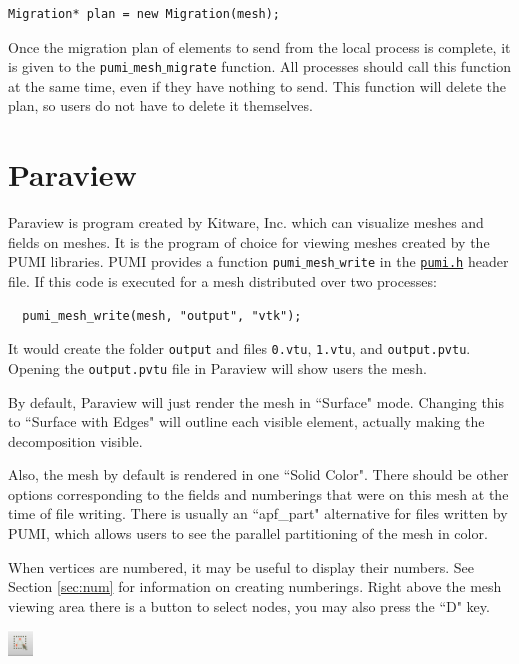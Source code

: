 \documentclass{article}
\begin{document}
{\begin{lstlisting}
Migration* plan = new Migration(mesh);
\end{lstlisting}

Once the migration plan of elements to send from
the local process is complete, it is given to the \texttt{pumi$\_$mesh$\_$migrate}
function.
All processes should call this function at the
same time, even if they have nothing to send.
This function will delete the plan, so users
do not have to delete it themselves.

\appendix

\section{Paraview}
\label{sec:paraview}

Paraview is program created by Kitware, Inc. which can visualize meshes
and fields on meshes.
It is the program of choice for viewing meshes created by the PUMI libraries.
PUMI provides a function \texttt{pumi$\_$mesh$\_$write} 
in the \href{https://github.com/SCOREC/core/blob/master/pumi/pumi.h}{\texttt{pumi.h}}
header file.
If this code is executed for a mesh distributed over two processes:

\begin{lstlisting}
  pumi_mesh_write(mesh, "output", "vtk");
\end{lstlisting}

It would create the folder \texttt{output} and files \texttt{0.vtu}, \texttt{1.vtu},
and \texttt{output.pvtu}.
Opening the \texttt{output.pvtu} file in Paraview will show users the
mesh.

By default, Paraview will just render the mesh in ``Surface" mode.
Changing this to ``Surface with Edges" will outline each visible element,
actually making the decomposition visible.

Also, the mesh by default is rendered in one ``Solid Color".
There should be other options corresponding to the fields and numberings
that were on this mesh at the time of file writing.
There is usually an ``apf\_part" alternative for files written by PUMI, which
allows users to see the parallel partitioning of the mesh in color.

When vertices are numbered, it may be useful to display their numbers.
See Section \ref{sec:num} for information on creating numberings.
Right above the mesh viewing area there is a button to select nodes,
you may also press the ``D" key.

\begin{center}
\includegraphics[width=0.05\textwidth]{select_nodes.png}
\end{center}

}
\end{document}
